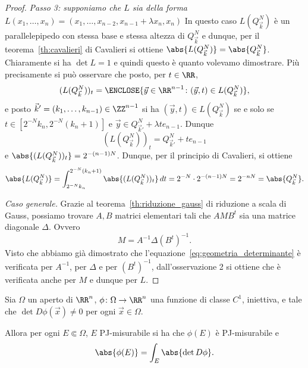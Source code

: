 \begin{proof}
\emph{Passo 3: supponiamo che $L$ sia della forma 
$L(x_1,\dots,x_n)=(x_1,\dots,x_{n-2}, x_{n-1} + \lambda x_n, x_n)$}
In questo caso $L(Q^N_{\vec k})$ è un parallelepipedo con stessa base 
e stessa altezza di $Q^N_{\vec k}$ e dunque, per il teorema~\ref{th:cavalieri}
di Cavalieri si ottiene $\abs{L(Q^N_{\vec k})} = \abs{Q^N_{\vec k}}$.
Chiaramente si ha $\det L = 1$ e quindi questo è quanto volevamo dimostrare.
Più precisamente si può osservare che posto, per $t\in \RR$,
\[
  (L(Q^N_{\vec k}))_t 
  = \ENCLOSE{\vec y \in \RR^{n-1} \colon (\vec y,t) \in L(Q^N_{\vec k})},
\]
e posto $\vec k' = (k_1,\ldots,k_{n-1})\in \ZZ^{n-1}$ si ha
$(\vec y,t) \in L(Q^N_{\vec k})$ se e solo se
$t\in [2^{-N} k_n, 2^{-N}(k_n+1)]$ e
$\vec y \in Q^N_{\vec k'} + \lambda t e_{n-1}$.
Dunque
\[
  (L(Q^N_{\vec k}))_t 
  = Q^N_{\vec k'} + t e_{n-1}
\]
e $\abs{(L(Q^N_{\vec k}))_t} = 2^{-(n-1)N}$.
Dunque, per il principio di Cavalieri, si ottiene
\[
  \abs{L(Q^N_{\vec k})}
  = \int_{2^{-N} k_n}^{2^{-N}(k_n+1)} \abs{(L(Q^N_{\vec k}))_t}\, dt
  = 2^{-N} \cdot 2^{-(n-1)N} 
  = 2^{-nN} = \abs{Q^N_{\vec k}}.
\]

\emph{Caso generale.}
Grazie al teorema~\ref{th:riduzione_gauss} di riduzione a scala di Gauss,
possiamo trovare
$A,B$ matrici elementari tali che
$AMB^t$ 
sia una matrice diagonale $\Delta$. 
Ovvero
\[
   M = A^{-1} \Delta (B^t)^{-1}.
\]
Visto che abbiamo già dimostrato che l'equazione~\eqref{eq:geometria_determinante} è verificata per $A^{-1}$, per $\Delta$ e per $(B^t)^{-1}$,
dall'osservazione 2 si ottiene che è verificata anche per $M$ e dunque per $L$.
\end{proof}

\begin{theorem}
  \label{th:formula-area}
Sia $\Omega$ un aperto di $\RR^n$, 
$\phi\colon \Omega \to \RR^n$ una funzione di 
classe $C^1$, iniettiva, 
e tale che $\det D \phi(\vec x)\neq 0$ per ogni $\vec x\in \Omega$.

Allora per ogni $E\Subset \Omega$,
$E$ PJ-misurabile si ha
che $\phi(E)$ è PJ-misurabile e 
\begin{equation}\label{eq:formula-area}
  \abs{\phi(E)} 
    = \int_{E} \abs{\det D\phi}.
\end{equation}
\end{theorem}

